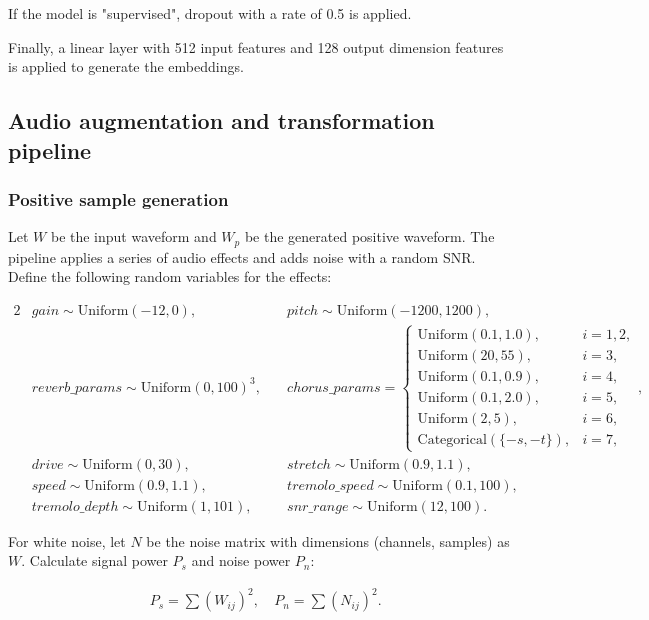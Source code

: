 If the model is "supervised", dropout with a rate of 0.5 is applied.



Finally, a linear layer with 512 input features and 128 output dimension features is applied to generate the embeddings.




\subsection{Audio augmentation and transformation pipeline}
\subsubsection{Positive sample generation}
Let $W$ be the input waveform and $W_p$ be the generated positive waveform. The pipeline applies a series of audio effects and adds noise with a random SNR. Define the following random variables for the effects:

\begin{alignat*}{2}
&gain \sim \text{Uniform}(-12, 0), \quad
&pitch \sim \text{Uniform}(-1200, 1200), \\
&reverb\_params \sim \text{Uniform}(0, 100)^3, \quad
&chorus\_params = \begin{cases}
\text{Uniform}(0.1, 1.0), & i=1,2, \\
\text{Uniform}(20, 55), & i=3, \\
\text{Uniform}(0.1, 0.9), & i=4, \\
\text{Uniform}(0.1, 2.0), & i=5, \\
\text{Uniform}(2, 5), & i=6, \\
\text{Categorical}(\{-s, -t\}), & i=7,
\end{cases}, \\
&drive \sim \text{Uniform}(0, 30), \quad
&stretch \sim \text{Uniform}(0.9, 1.1), \\
&speed \sim \text{Uniform}(0.9, 1.1), \quad
&tremolo\_speed \sim \text{Uniform}(0.1, 100), \\
&tremolo\_depth \sim \text{Uniform}(1, 101), \quad
&snr\_range \sim \text{Uniform}(12, 100).
\end{alignat*}

For white noise, let $N$ be the noise matrix with dimensions (channels, samples) as $W$. Calculate signal power $P_s$ and noise power $P_n$:

\begin{align*}
&P_s = \sum (W_{ij})^2, \
&P_n = \sum (N_{ij})^2.
\end{align*}

